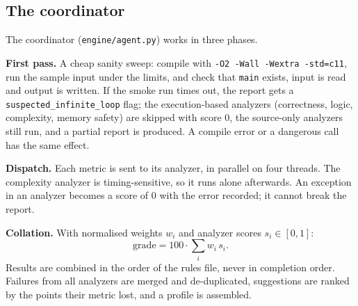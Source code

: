 \documentclass[11pt,a4paper]{article}
\newcommand{\file}[1]{\nolinkurl{#1}}
\begin{document}
\subsection{The coordinator}\label{sec:agent}
The coordinator (\file{engine/agent.py}) works in three phases.

\textbf{First pass.} A cheap sanity sweep: compile with \texttt{-O2 -Wall -Wextra -std=c11}, run the sample input under
the limits, and check that \texttt{main} exists, input is read and output is written. If the smoke run times out, the
report gets a \texttt{suspected\_infinite\_loop} flag; the execution-based analyzers (correctness, logic, complexity,
memory safety) are skipped with score 0, the source-only analyzers still run, and a partial report is produced.
A compile error or a dangerous call has the same effect.

\textbf{Dispatch.} Each metric is sent to its analyzer, in parallel on four threads. The complexity analyzer is
timing-sensitive, so it runs alone afterwards. An exception in an analyzer becomes a score of 0 with the error recorded;
it cannot break the report.

\textbf{Collation.} With normalised weights $w_i$ and analyzer scores $s_i\in[0,1]$:
\[ \text{grade} = 100 \cdot \sum_i w_i\, s_i . \]
Results are combined in the order of the rules file, never in completion order. Failures from all analyzers are merged
and de-duplicated, suggestions are ranked by the points their metric lost, and a profile is assembled.
\end{document}
